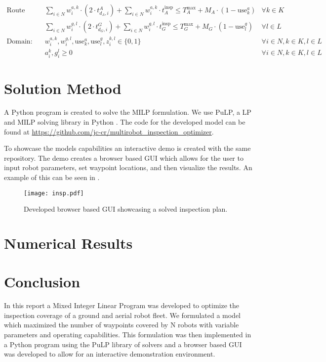 \documentclass{article}
\begin{document}
{\begin{align}
		\text{Route Length:} \quad & \sum_{i \in N} w_i^{a,k} \cdot \left( 2 \cdot t_{d_A,i}^{A}\right) + \sum_{i \in N} w_i^{a,k} \cdot t_A^{\text{insp}} \leq T_A^{\max} + M_A \cdot (1 - \text{use}_k^a) & \forall k \in K \tag{19} \\
		& \sum_{i \in N} w_i^{g,l} \cdot \left( 2 \cdot t_{d_G,i}^{G}\right) + \sum_{i \in N} w_i^{g,l} \cdot t_G^{\text{insp}} \leq T_G^{\max} + M_G \cdot (1 - \text{use}_l^g) & \forall l \in L \tag{20} \\
		\text{Domain:} \quad & w_i^{a,k}, w_i^{g,l}, \text{use}_k^a, \text{use}_l^g, z_i^{k,l} \in \{0,1\} & \forall i \in N, k \in K, l \in L \tag{21} \\
		& a_i^k, g_i^l \geq 0 & \forall i \in N, k \in K, l \in L \tag{22}
		\end{align}
		}


	\section{Solution Method}\label{sol_methods}

		A Python program is created to solve the MILP formulation. 
		We use PuLP, a LP and MILP solving library in Python \cite{pulp}.
		The code for the developed model can be found at \url{https://github.com/jc-cr/multirobot_inspection_optimizer}.

		To showcase the models capabilities an interactive demo is created with the same repository. 
		The demo creates a browser based GUI which allows for the user to input robot parameters, set waypoint locations, and then visualize the results.
		An example of this can be seen in .

		\begin{figure}[htbp]
			\centering
			\texttt{[image: insp.pdf]}
			\caption{Developed browser based GUI showcasing a solved inspection plan.}
			\label{fig:demo}
		\end{figure}


	\section{Numerical Results}\label{numerical_results}




	\section{Conclusion}\label{conclusion}

	In this report a Mixed Integer Linear Program was developed to optimize the inspection coverage of a ground and aerial robot fleet. 
	We formulated a model which maximized the number of waypoints covered by N robots with variable parameters and operating capabilities.
	This formulation was then implemented in a Python program using the PuLP library of solvers and a browser based GUI was developed to allow for an interactive demonstration environment.

	\newpage
	
	\nocite{*}
	
\end{document}
